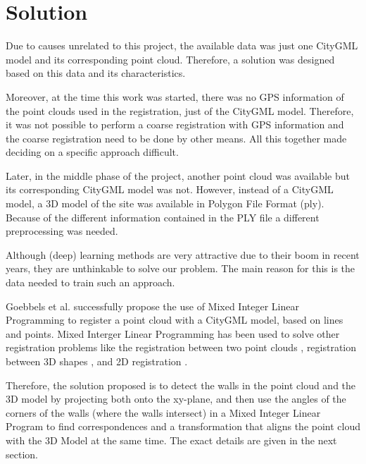

    \chapter{Solution}
        Due to causes unrelated to this project, the available data was just one CityGML model and its corresponding point cloud.
        Therefore, a solution was designed based on this data and its characteristics.

        Moreover, at the time this work was started, there was no GPS information of the point clouds used in the registration, just of the CityGML model. 
        Therefore, it was not possible to perform a coarse registration with GPS information and the coarse registration need to be done by other means.
        All this together made deciding on a specific approach difficult.

        Later, in the middle phase of the project, another point cloud was available but its corresponding CityGML model was not.
        However, instead of a CityGML model, a 3D model of the site was available in Polygon File Format (ply).
        Because of the different information contained in the PLY file a different preprocessing was needed.

        Although (deep) learning methods are very attractive due to their boom in recent years,
        they are unthinkable to solve our problem. The main reason for this is the data needed to train such an approach.

        Goebbels et al. \cite{Goebbels_2018_linebased, Goebbels_2018_alinear} successfully propose the use of Mixed Integer Linear Programming to register
        a point cloud with a CityGML model, based on lines and points.
        Mixed Interger Linear Programming has been used to solve other registration problems
        like the registration between two point clouds \cite{Sakakubara_2007_automatic},
        registration between 3D shapes \cite{Windheuser_2011_largescale},
        and 2D registration \cite{Bazin_2013_abranchandbound}.

        Therefore, the solution proposed is to detect the walls in the point cloud and the 3D model by projecting both onto the xy-plane,  
        and then use the angles of the corners of the walls (where the walls intersect)
        in a Mixed Integer Linear Program to find correspondences and a transformation that aligns the point cloud with the 3D Model at the same time.
        The exact details are given in the next section.

